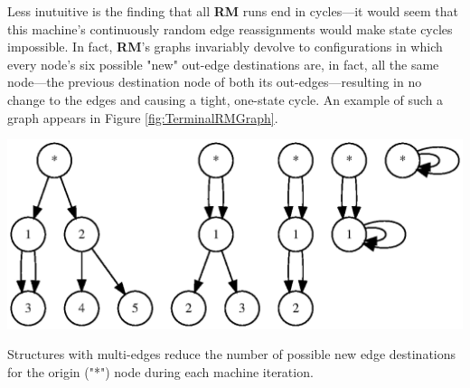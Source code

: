 \documentclass{tufte-handout}
\begin{document}
Less inutuitive is the finding that all \textbf{RM} runs end in cycles---it would
seem that this machine's continuously random edge reassignments would
make state cycles impossible. In fact, \textbf{RM}'s graphs invariably devolve
to configurations in which every node's six possible "new" out-edge destinations
are, in fact, all the same node---the previous destination node of both its
out-edges---resulting in no change to the edges and causing a tight, one-state cycle.
An example of such a graph appears in Figure \ref{fig:TerminalRMGraph}.


\begin{marginfigure}
\includegraphics{multiedges.ps}
\caption{Structures with multi-edges reduce the number of possible new edge destinations for
the origin ("*") node during each machine iteration.}
\label{fig:Multiedges}
\end{marginfigure}
\end{document}
